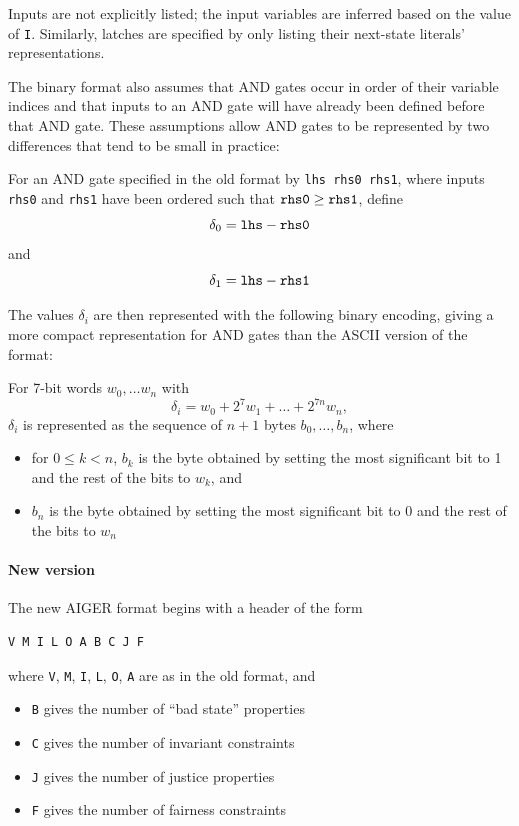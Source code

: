 \documentclass[12pt,a4paper,twoside,openright]{report}
\begin{document}
{{Inputs are not explicitly listed; the input variables are inferred based on
the value of \verb,I,.
Similarly, latches are specified by only listing their next-state literals'
representations.

The binary format also assumes that AND gates occur in order of their
variable indices and that inputs to an AND gate will
have already been defined before that AND gate.
These assumptions allow AND gates to be represented by two differences
that tend to be small in practice:

For an AND gate specified in the old format by \verb,lhs rhs0 rhs1,,
where inputs \verb,rhs0, and \verb,rhs1, have been ordered such that
$\verb,rhs0, \geq \verb,rhs1,$, define
$$\delta_0 = \verb,lhs, - \verb,rhs0,$$
and
$$\delta_1 = \verb,lhs, - \verb,rhs1,$$

The values $\delta_i$ are then represented with the following binary
encoding, giving a more compact representation for AND gates than
the ASCII version of the format:

For 7-bit words $w_0, \ldots w_n$ with
$$\delta_i = w_0 + 2^7w_1 + \ldots + 2^{7n}w_n,$$
$\delta_i$ is represented as the sequence of $n + 1$ bytes
$b_0, \ldots, b_n$, where
\begin{itemize}
\item for $0 \leq k < n$, $b_k$ is the byte obtained by setting the most
significant bit to 1 and the rest of the bits to $w_k$, and
\item $b_n$ is the byte obtained by setting the most
significant bit to 0 and the rest of the bits to $w_n$
\end{itemize}}


\paragraph{New version} {
The new AIGER format begins with a header of the form
\begin{verbatim}
V M I L O A B C J F
\end{verbatim}
where \verb,V,, \verb,M,, \verb,I,, \verb,L,, \verb,O,, \verb,A, are as
in the old format, and
\begin{itemize}
\item \verb,B, gives the number of ``bad state'' properties
\item \verb,C, gives the number of invariant constraints
\item \verb,J, gives the number of justice properties
\item \verb,F, gives the number of fairness constraints
\end{itemize}

}}
\end{document}
